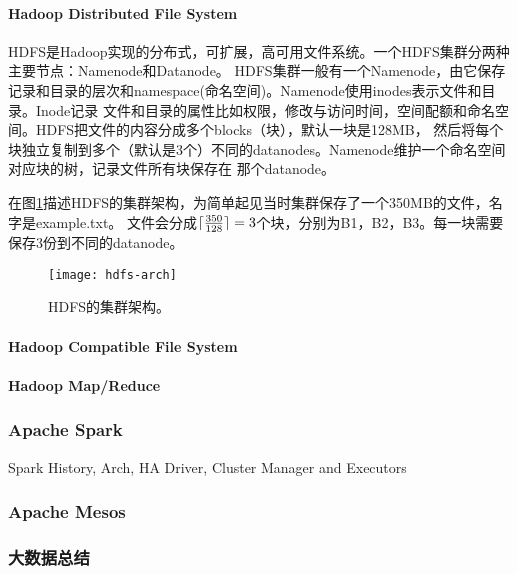 \paragraph*{Hadoop Distributed File System}
HDFS是Hadoop实现的分布式，可扩展，高可用文件系统。一个HDFS集群分两种主要节点：Namenode和Datanode。
HDFS集群一般有一个Namenode，由它保存记录和目录的层次和namespace(命名空间)。Namenode使用inodes表示文件和目录。Inode记录
文件和目录的属性比如权限，修改与访问时间，空间配额和命名空间。HDFS把文件的内容分成多个blocks（块），默认一块是128MB，
然后将每个块独立复制到多个（默认是3个）不同的datanodes。Namenode维护一个命名空间对应块的树，记录文件所有块保存在
那个datanode。

在图\ref{fig:hdfs-arch}描述HDFS的集群架构，为简单起见当时集群保存了一个350MB的文件，名字是example.txt。
文件会分成$\lceil\frac{350}{128}\rceil = 3$个块，分别为B1，B2，B3。每一块需要保存3份到不同的datanode。

\begin{figure}
  \centering
    \texttt{[image: hdfs-arch]}
    \caption{HDFS的集群架构。}
  \label{fig:hdfs-arch}
\end{figure}


\paragraph*{Hadoop Compatible File System}

\paragraph*{Hadoop Map/Reduce}


\subsubsection{Apache Spark}
\label{subsubsec:spark}
Spark History, Arch, HA
Driver, Cluster Manager and Executors

\subsubsection{Apache Mesos}


\subsubsection{大数据总结}

